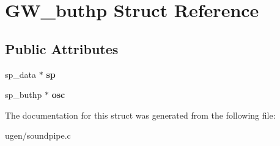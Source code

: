 \hypertarget{structGW__buthp}{}\section{G\+W\+\_\+buthp Struct Reference}
\label{structGW__buthp}
\subsection*{Public Attributes}
\begin{DoxyCompactItemize}
\item 
\hypertarget{structGW__buthp_af94261f5ed2a3ef2fe07314e66c67061}{}\label{structGW__buthp_af94261f5ed2a3ef2fe07314e66c67061} 
sp\+\_\+data $\ast$ {\bfseries sp}
\item 
\hypertarget{structGW__buthp_ab9f7af9b2a08b0e0cce75b2e7ba097aa}{}\label{structGW__buthp_ab9f7af9b2a08b0e0cce75b2e7ba097aa} 
sp\+\_\+buthp $\ast$ {\bfseries osc}
\end{DoxyCompactItemize}


The documentation for this struct was generated from the following file\+:\begin{DoxyCompactItemize}
\item 
ugen/soundpipe.\+c\end{DoxyCompactItemize}
